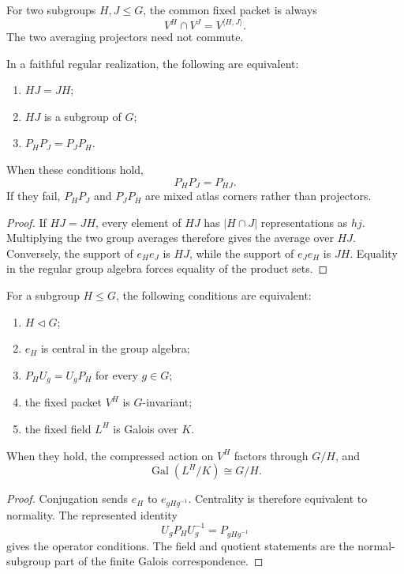 For two subgroups \(H,J\leq G\), the common fixed packet is always
\[
 V^H\cap V^J=V^{\langle H,J\rangle}.
\]
The two averaging projectors need not commute.

\begin{theorem}
\label{thm:block12-permutable}
In a faithful regular realization, the following are equivalent:
\begin{enumerate}
\item \(HJ=JH\);
\item \(HJ\) is a subgroup of \(G\);
\item \(P_HP_J=P_JP_H\).
\end{enumerate}
When these conditions hold,
\[
 \boxed{P_HP_J=P_{HJ}.}
 \tag{12.4}
\]
If they fail, \(P_HP_J\) and \(P_JP_H\) are mixed atlas corners rather than projectors.
\end{theorem}

\begin{proof}
If \(HJ=JH\), every element of \(HJ\) has \(|H\cap J|\) representations as \(hj\).  Multiplying the two group averages therefore gives the average over \(HJ\).  Conversely, the support of \(e_He_J\) is \(HJ\), while the support of \(e_Je_H\) is \(JH\).  Equality in the regular group algebra forces equality of the product sets.
\end{proof}

\begin{theorem}
\label{thm:block12-normality}
For a subgroup \(H\leq G\), the following conditions are equivalent:
\begin{enumerate}
\item \(H\triangleleft G\);
\item \(e_H\) is central in the group algebra;
\item \(P_HU_g=U_gP_H\) for every \(g\in G\);
\item the fixed packet \(V^H\) is \(G\)-invariant;
\item the fixed field \(L^H\) is Galois over \(K\).
\end{enumerate}
When they hold, the compressed action on \(V^H\) factors through \(G/H\), and
\[
 \boxed{\operatorname{Gal}(L^H/K)\cong G/H.}
 \tag{12.5}
\]
\end{theorem}

\begin{proof}
Conjugation sends \(e_H\) to \(e_{gHg^{-1}}\).  Centrality is therefore equivalent to normality.  The represented identity
\[
 U_gP_HU_g^{-1}=P_{gHg^{-1}}
\]
gives the operator conditions.  The field and quotient statements are the normal-subgroup part of the finite Galois correspondence.
\end{proof}

